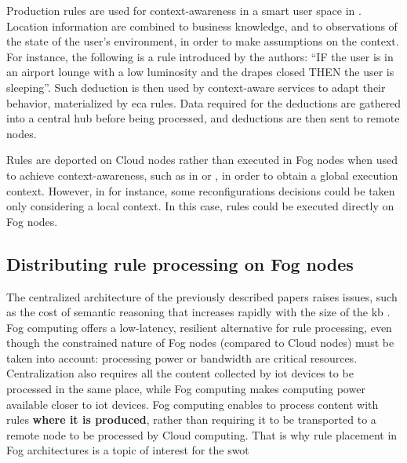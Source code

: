 \documentclass{iosart2c}
\begin{document}
Production rules are used for context-awareness in a smart user space in \cite{Hussein2016}.
Location information are combined to business knowledge, and to observations of the state of the user's environment, in order to make assumptions on the context.
For instance, the following is a rule introduced by the authors: ``IF the user is in an airport lounge with a low luminosity and the drapes closed THEN the user is sleeping''.
Such deduction is then used by context-aware services to adapt their behavior, materialized by \gls{eca} rules.
Data required for the deductions are gathered into a central hub before being processed, and deductions are then sent to remote nodes.

Rules are deported on Cloud nodes rather than executed in Fog nodes when used to achieve context-awareness, such as in \cite{Evchina2015} or \cite{Hussein2016}, in order to obtain a global execution context.
However, in \cite{Rodriguez2010} for instance, some reconfigurations decisions could be taken only considering a local context. 
In this case, rules could be executed directly on Fog nodes.

\subsection{Distributing rule processing on Fog nodes}

The centralized architecture of the previously described papers raises issues, such as the cost of semantic reasoning that increases rapidly with the size of the \gls{kb} \cite{Maarala2017}.
Fog computing offers a low-latency, resilient alternative for rule processing, even though the constrained nature of Fog nodes (compared to Cloud nodes) must be taken into account: processing power or bandwidth are critical resources.
Centralization also requires all the content collected by \gls{iot} devices to be processed in the same place, while Fog computing makes computing power available closer to \gls{iot} devices.
Fog computing enables to process content with rules \textbf{where it is produced}, rather than requiring it to be transported to a remote node to be processed by Cloud computing.
That is why rule placement in Fog architectures is a topic of interest for the \gls{swot}
\end{document}

